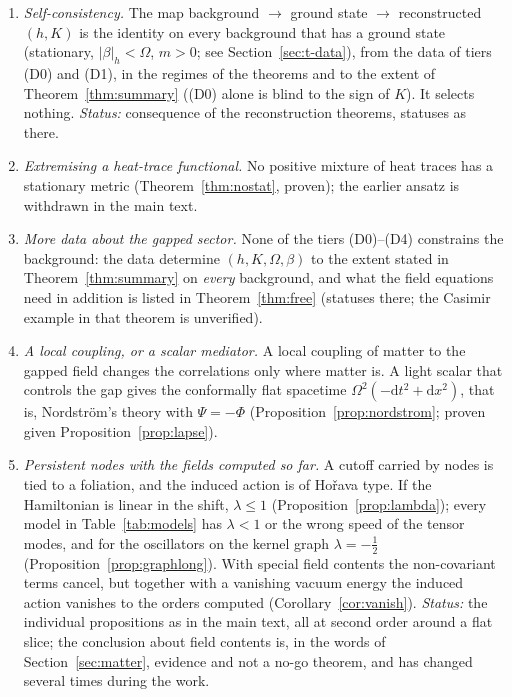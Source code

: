 \documentclass[11pt,a4paper]{article}
\theoremstyle{stmt}
\theoremstyle{defn}
\theoremstyle{rmk}
\numberwithin{equation}{section}
\newcommand{\dd}{\mathrm{d}}
\begin{document}
{\begin{enumerate}
\item[(X1)] \emph{Self-consistency.} The map background $\to$ ground state $\to$ reconstructed $(h,K)$ is the identity on every background that has a ground state (stationary, $|\beta|_h<\Omega$, $m>0$; see Section~\ref{sec:t-data}), from the data of tiers \textup{(D0)} and \textup{(D1)}, in the regimes of the theorems and to the extent of Theorem~\ref{thm:summary} (\textup{(D0)} alone is blind to the sign of $K$). It selects nothing. \emph{Status:} consequence of the reconstruction theorems, statuses as there.
\item[(X2)] \emph{Extremising a heat-trace functional.} No positive mixture of heat traces has a stationary metric (Theorem~\ref{thm:nostat}, proven); the earlier ansatz is withdrawn in the main text.
\item[(X3)] \emph{More data about the gapped sector.} None of the tiers \textup{(D0)}--\textup{(D4)} constrains the background: the data determine $(h,K,\Omega,\beta)$ to the extent stated in Theorem~\ref{thm:summary} on \emph{every} background, and what the field equations need in addition is listed in Theorem~\ref{thm:free} (statuses there; the Casimir example in that theorem is unverified).
\item[(X4)] \emph{A local coupling, or a scalar mediator.} A local coupling of matter to the gapped field changes the correlations only where matter is. A light scalar that controls the gap gives the conformally flat spacetime $\Omega^2(-\dd t^2+\dd x^2)$, that is, Nordstr\"om's theory with $\Psi=-\Phi$ (Proposition~\ref{prop:nordstrom}; proven given Proposition~\ref{prop:lapse}).
\item[(X5)] \emph{Persistent nodes with the fields computed so far.} A cutoff carried by nodes is tied to a foliation, and the induced action is of Ho\v{r}ava type. If the Hamiltonian is linear in the shift, $\lambda\le1$ (Proposition~\ref{prop:lambda}); every model in Table~\ref{tab:models} has $\lambda<1$ or the wrong speed of the tensor modes, and for the oscillators on the kernel graph $\lambda=-\tfrac12$ (Proposition~\ref{prop:graphlong}). With special field contents the non-covariant terms cancel, but together with a vanishing vacuum energy the induced action vanishes to the orders computed (Corollary~\ref{cor:vanish}). \emph{Status:} the individual propositions as in the main text, all at second order around a flat slice; the conclusion about field contents is, in the words of Section~\ref{sec:matter}, evidence and not a no-go theorem, and has changed several times during the work.
\end{enumerate}

}
\end{document}

